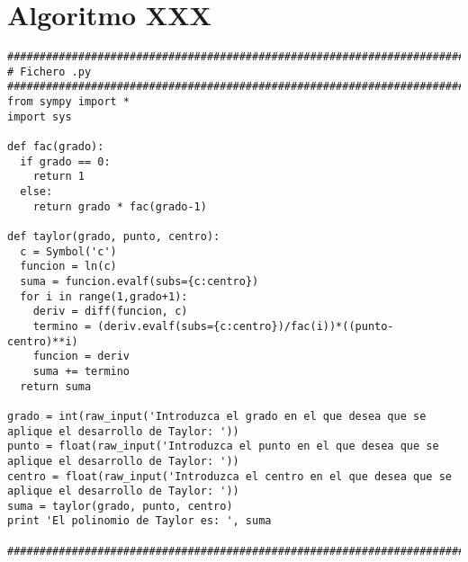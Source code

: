 \section{Algoritmo XXX}
\label{Apendice1:XXX}

\begin{center}
\begin{footnotesize}
\begin{verbatim}
###################################################################################
# Fichero .py
###################################################################################
from sympy import *
import sys
 
def fac(grado):
  if grado == 0:
    return 1
  else:
    return grado * fac(grado-1)

def taylor(grado, punto, centro):
  c = Symbol('c')
  funcion = ln(c)
  suma = funcion.evalf(subs={c:centro})
  for i in range(1,grado+1):
    deriv = diff(funcion, c)
    termino = (deriv.evalf(subs={c:centro})/fac(i))*((punto-centro)**i)
    funcion = deriv
    suma += termino
  return suma

grado = int(raw_input('Introduzca el grado en el que desea que se aplique el desarrollo de Taylor: '))
punto = float(raw_input('Introduzca el punto en el que desea que se aplique el desarrollo de Taylor: '))
centro = float(raw_input('Introduzca el centro en el que desea que se aplique el desarrollo de Taylor: '))
suma = taylor(grado, punto, centro)
print 'El polinomio de Taylor es: ', suma

###################################################################################
\end{verbatim}
\end{footnotesize}
\end{center}
